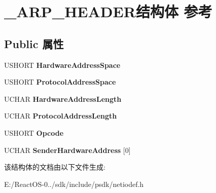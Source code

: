 \hypertarget{struct___a_r_p___h_e_a_d_e_r}{}\section{\+\_\+\+A\+R\+P\+\_\+\+H\+E\+A\+D\+E\+R结构体 参考}
\label{struct___a_r_p___h_e_a_d_e_r}
\subsection*{Public 属性}
\begin{DoxyCompactItemize}
\item 
\mbox{\label{struct___a_r_p___h_e_a_d_e_r_ab2b952fdf463c128df92a6d8be83b0ef}} 
U\+S\+H\+O\+RT {\bfseries Hardware\+Address\+Space}
\item 
\mbox{\label{struct___a_r_p___h_e_a_d_e_r_a2ca9d3d60d35b6195a993dc46138bda0}} 
U\+S\+H\+O\+RT {\bfseries Protocol\+Address\+Space}
\item 
\mbox{\label{struct___a_r_p___h_e_a_d_e_r_a8a60c16af08524af2d1f1093713479ed}} 
U\+C\+H\+AR {\bfseries Hardware\+Address\+Length}
\item 
\mbox{\label{struct___a_r_p___h_e_a_d_e_r_a95b4cebc6bfd35c5cffdc34512dc23e4}} 
U\+C\+H\+AR {\bfseries Protocol\+Address\+Length}
\item 
\mbox{\label{struct___a_r_p___h_e_a_d_e_r_a4acf6a21bb054417cdeb10218ba3132a}} 
U\+S\+H\+O\+RT {\bfseries Opcode}
\item 
\mbox{\label{struct___a_r_p___h_e_a_d_e_r_a61c0075225e54ca176c57f2776e56eb4}} 
U\+C\+H\+AR {\bfseries Sender\+Hardware\+Address} \mbox{[}0\mbox{]}
\end{DoxyCompactItemize}


该结构体的文档由以下文件生成\+:\begin{DoxyCompactItemize}
\item 
E\+:/\+React\+O\+S-\/0../sdk/include/psdk/netiodef.\+h\end{DoxyCompactItemize}
